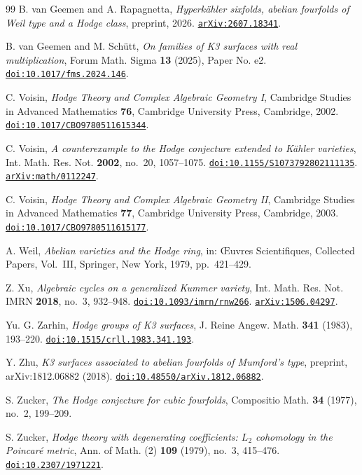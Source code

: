 \documentclass[11pt,reqno]{amsart}
\theoremstyle{plain}
\theoremstyle{definition}
\theoremstyle{remark}
\begin{document}
\begin{thebibliography}{99}
B. van Geemen and A. Rapagnetta,
\emph{Hyperk\"ahler sixfolds, abelian fourfolds of Weil type and a Hodge
class},
preprint, 2026.
\href{https://arxiv.org/abs/2607.18341}{\texttt{arXiv:2607.18341}}.

B. van Geemen and M. Sch\"utt,
\emph{On families of K3 surfaces with real multiplication},
Forum Math. Sigma \textbf{13} (2025), Paper No. e2.
\href{https://doi.org/10.1017/fms.2024.146}{\texttt{doi:10.1017/fms.2024.146}}.

C. Voisin,
\emph{Hodge Theory and Complex Algebraic Geometry I},
Cambridge Studies in Advanced Mathematics \textbf{76},
Cambridge University Press, Cambridge, 2002.
\href{https://doi.org/10.1017/CBO9780511615344}{\texttt{doi:10.1017/CBO9780511615344}}.

C. Voisin,
\emph{A counterexample to the Hodge conjecture extended to K\"ahler
varieties},
Int. Math. Res. Not. \textbf{2002}, no.~20, 1057--1075.
\href{https://doi.org/10.1155/S1073792802111135}{\texttt{doi:10.1155/S1073792802111135}}.
\href{https://arxiv.org/abs/math/0112247}{\texttt{arXiv:math/0112247}}.

C. Voisin,
\emph{Hodge Theory and Complex Algebraic Geometry II},
Cambridge Studies in Advanced Mathematics \textbf{77},
Cambridge University Press, Cambridge, 2003.
\href{https://doi.org/10.1017/CBO9780511615177}{\texttt{doi:10.1017/CBO9780511615177}}.

A. Weil,
\emph{Abelian varieties and the Hodge ring},
in: \OE uvres Scientifiques, Collected Papers, Vol.~III,
Springer, New York, 1979, pp.~421--429.

Z. Xu,
\emph{Algebraic cycles on a generalized Kummer variety},
Int. Math. Res. Not. IMRN \textbf{2018}, no.~3, 932--948.
\href{https://doi.org/10.1093/imrn/rnw266}{\texttt{doi:10.1093/imrn/rnw266}}.
\href{https://arxiv.org/abs/1506.04297}{\texttt{arXiv:1506.04297}}.

Yu. G. Zarhin,
\emph{Hodge groups of K3 surfaces},
J. Reine Angew. Math. \textbf{341} (1983), 193--220.
\href{https://doi.org/10.1515/crll.1983.341.193}{\texttt{doi:10.1515/crll.1983.341.193}}.

Y. Zhu,
\emph{K3 surfaces associated to abelian fourfolds of Mumford's type},
preprint, arXiv:1812.06882 (2018).
\href{https://doi.org/10.48550/arXiv.1812.06882}{\texttt{doi:10.48550/arXiv.1812.06882}}.

S. Zucker,
\emph{The Hodge conjecture for cubic fourfolds},
Compositio Math. \textbf{34} (1977), no.~2, 199--209.

S. Zucker,
\emph{Hodge theory with degenerating coefficients: $L_{2}$ cohomology in the
Poincar\'e metric},
Ann. of Math. (2) \textbf{109} (1979), no.~3, 415--476.
\href{https://doi.org/10.2307/1971221}{\texttt{doi:10.2307/1971221}}.

\end{thebibliography}
\end{document}
